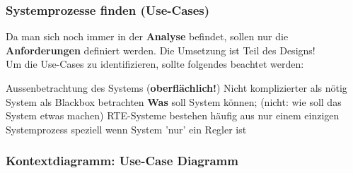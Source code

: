 \subsubsection{Systemprozesse finden (Use-Cases)}

Da man sich noch immer in der \textbf{Analyse} befindet, sollen nur die \textbf{Anforderungen} definiert werden. Die Umsetzung ist Teil
des Designs! \\
Um die Use-Cases zu identifizieren, sollte folgendes beachtet werden:

\vspace{0.1cm}

\begin{outline}
    \1 Aussenbetrachtung des Systems (\textbf{oberflächlich!})
        \2 Nicht komplizierter als nötig
    \1 System als Blackbox betrachten 
        \2 \textbf{Was} soll System können; (nicht: wie soll das System etwas machen)
    \1 RTE-Systeme bestehen häufig aus nur einem einzigen Systemprozess 
        \2 speziell wenn System 'nur' ein Regler ist
\end{outline}


\subsubsection{Kontextdiagramm: Use-Case Diagramm}

